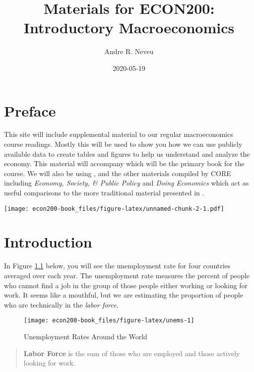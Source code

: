 \documentclass[
]{book}
\title{Materials for ECON200: Introductory Macroeconomics}
\author{Andre R. Neveu}
\date{2020-05-19}
\begin{document}
\maketitle

{
\setcounter{tocdepth}{1}
\tableofcontents
}
\hypertarget{preface}{%
\chapter*{Preface}\label{preface}}

This site will include supplemental material to our regular macroeconomics course readings. Mostly this will be used to show you how we can use publicly available data to create tables and figures to help us understand and analyze the economy. This material will accompany \citet{tw} which will be the primary book for the course. We will also be using \citet{core}, and the other materials compiled by CORE including \emph{Economy, Society, \& Public Policy} \citep{espp} and \emph{Doing Economics} \citep{doing} which act as useful comparisons to the more traditional material presented in \citet{tw}.

\texttt{[image: econ200-book\_files/figure-latex/unnamed-chunk-2-1.pdf]}

\hypertarget{intro}{%
\chapter{Introduction}\label{intro}}

In Figure \ref{fig:unems} below, you will see the unemployment rate for four countries averaged over each year. The unemployment rate measures the percent of people who cannot find a job in the group of those people either working or looking for work. It seems like a mouthful, but we are estimating the proportion of people who are technically in the \emph{labor force}.

\begin{figure}

{\centering \texttt{[image: econ200-book\_files/figure-latex/unems-1]} 

}

\caption{Unemployment Rates Around the World}\label{fig:unems}
\end{figure}

\begin{quote}
\textbf{Labor Force} is the sum of those who are employed and those actively looking for work.
\end{quote}
\end{document}
